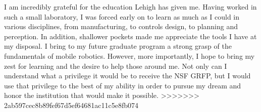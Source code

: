\documentclass[10pt]{article}
\begin{document}
I am incredibly grateful for the education Lehigh has given me. Having worked
in such a small laboratory, I was forced early on to learn as much as I could
in various disciplines, from manufacturing, to controls design, to planning and
perception. In addition, shallower pockets made me appreciate the tools I have
at my disposal. I bring to my future graduate program a strong grasp of the
fundamentals of mobile robotics. However, more importantly, I hope to bring my
zest for learning and the desire to help those around me. Not only can I
understand what a privilege it would be to receive the NSF GRFP, but I would
use that privilege to the best of my ability in order to pursue my dream and
honor the institution that would make it possible.
>>>>>>> 2ab597cec8b89fef67d5ef64681ac11c5e8fb074
\end{document}
